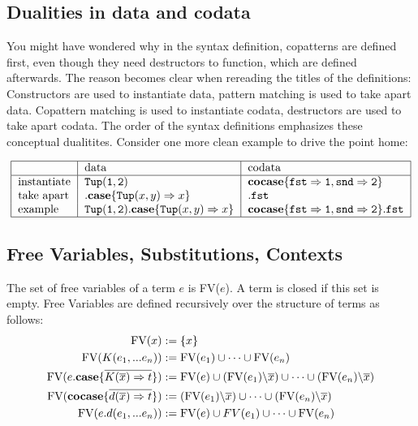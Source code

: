 \documentclass[twoside,12pt,a4paper]{article}
\begin{document}
\subsection{Dualities in data and codata}
You might have wondered why in the syntax definition, copatterns are defined first, even though they need destructors to function, which are defined afterwards.
The reason becomes clear when rereading the titles of the definitions:
Constructors are used to instantiate data, pattern matching is used to take apart data.
Copattern matching is used to instantiate codata, destructors are used to take apart codata.
The order of the syntax definitions emphasizes these conceptual dualitites.
Consider one more clean example to drive the point home:  

\begin{example}
    \begin{align*}
        \begin{tabular}{|l | l | l|}
            \hline
            & data & codata\\
            \hline
            instantiate & $\mathtt{Tup(1,2)}$&  $\excopatmatch{\mathtt{fst\Rightarrow 1, snd\Rightarrow 2}}$\\
            take apart & $.\expatmatch{\mathttbrackets{Tup}{x, y}\Rightarrow x}$ & $.\mathtt{fst}$\\
            example & $\mathtt{Tup(1,2)}.\expatmatch{\mathttbrackets{Tup}{x, y}\Rightarrow x}$&$\excopatmatch{\mathtt{fst\Rightarrow 1, snd\Rightarrow 2}}.\mathtt{fst}$\\
           \hline
       \end{tabular}
    \end{align*}        
\end{example} %

\subsection{Free Variables, Substitutions, Contexts}

\begin{definition}
    The set of free variables of a term $e$ is FV($e$). A term is closed if this set is empty.
    Free Variables are defined recursively over the structure of terms as follows:
    \begin{align*}
        \begin{split}
            \text{FV}(x) &:= \{x\}\\
            \text{FV}(K(e_1,...e_n)) &:= \text{FV}(e_1) \cup \dots\cup \text{FV}(e_n)\\
            \text{FV}(e.\textbf{case}\{\overline{K(\overline{x})\Rightarrow t}\}) &:= \text{FV}(e)\cup (\text{FV}(e_1)\backslash\overline{x})\cup \dots\cup (\text{FV}(e_n)\backslash\overline{x})\\
            \text{FV}(\textbf{cocase}\{\overline{d(\overline{x})\Rightarrow t}\}) &:= (\text{FV}(e_1)\backslash\overline{x})\cup \dots\cup (\text{FV}(e_n)\backslash\overline{x})\\
            \text{FV}(e.d(e_1,...e_n)) &:= \text{FV}(e)\cup FV(e_1) \cup \dots \cup \text{FV}(e_n)    
        \end{split}
    \end{align*}
\end{definition}
\end{document}
